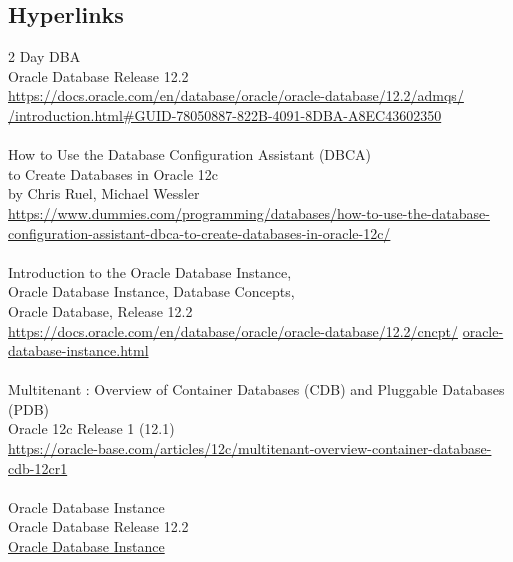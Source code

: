 
\subsection{Hyperlinks}

2 Day DBA\\
Oracle Database Release 12.2\\
\href{https://docs.oracle.com/en/database/oracle/oracle-database/12.2/admqs/introduction.html#GUID-78050887-822B-4091-8DBA-A8EC43602350}{https://docs.oracle.com/en/database/oracle/oracle-database/12.2/admqs/}\\
\href{https://docs.oracle.com/en/database/oracle/oracle-database/12.2/admqs/introduction.html#GUID-78050887-822B-4091-8DBA-A8EC43602350}{/introduction.html\#GUID-78050887-822B-4091-8DBA-A8EC43602350}\\
\\
How to Use the Database Configuration Assistant (DBCA)\\
to Create Databases in Oracle 12c\\
by Chris Ruel, Michael Wessler\\
\href{https://www.dummies.com/programming/databases/how-to-use-the-database-configuration-assistant-dbca-to-create-databases-in-oracle-12c/}{https://www.dummies.com/programming/databases/how-to-use-the-database-configuration-assistant-dbca-to-create-databases-in-oracle-12c/}\\
\\
Introduction to the Oracle Database Instance,\\ 
Oracle Database Instance, Database Concepts,\\
Oracle Database, Release 12.2\\
\href{https://docs.oracle.com/en/database/oracle/oracle-database/12.2/cncpt/oracle-database-instance.html}{https://docs.oracle.com/en/database/oracle/oracle-database/12.2/cncpt/}\newline
\href{http://www.google.com}{oracle-database-instance.html}\\
\\
Multitenant : Overview of Container Databases (CDB) and Pluggable Databases (PDB)\\
Oracle 12c Release 1 (12.1)\\
\href{https://oracle-base.com/articles/12c/multitenant-overview-container-database-cdb-12cr1}{https://oracle-base.com/articles/12c/multitenant-overview-container-database-cdb-12cr1}\\
\\
Oracle Database Instance\\
Oracle Database Release 12.2\\
\href{https://docs.oracle.com/en/database/oracle/oracle-database/12.2/cncpt/oracle-database-instance.html#GUID-67247052-CE3F-44D2-BA3E-7067DEF4B6D5}{Oracle Database Instance}\\
\\
